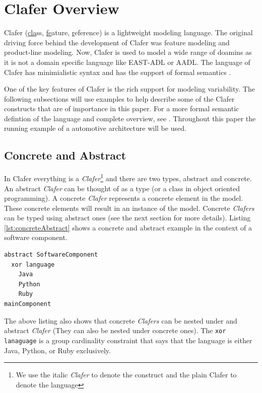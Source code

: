 \documentclass[10pt,oneside]{IEEEtran}
\begin{document}
\section{Clafer Overview}
Clafer (\underline{cla}ss, \underline{fe}ature, \underline{r}eference) is a lightweight modeling language.
The original driving force behind the development of Clafer was feature modeling and product-line modeling.
Now, Clafer is used to model a wide range of doamins as it is not a domain specific language like EAST-ADL
or AADL. The language of Clafer has minimialistic syntax and has the support of
formal semantics \cite{9}.

One of the key features of Clafer is the rich support for modeling variability. The following subsections
will use examples to help describe some of the Clafer constructs that are of importance in this paper.
For a more formal semantic defintion of the language and complete overview, see \cite{10}.
Throughout this paper the running example of a automotive architecture will be used.

\subsection{Concrete and Abstract}
In Clafer everything is a \textit{Clafer}\footnote{We use the italic \textit{Clafer} to denote the construct
and the plain Clafer to denote the language} and there are two types, abstract and concrete. An abstract
\textit{Clafer} can be thought of as a type (or a class in object oriented programming). A concrete
\textit{Clafer} represents a concrete element in the model. These concrete elements will result in an
instance of the model. Concrete \textit{Clafers} can be typed using abstract ones (see the next section
for more details). Listing \ref{lst:concreteAbstract} shows a concrete and abstract example in the
context of a software component.

\begin{lstlisting}[label={lst:concreteAbstract},caption={Example of abstract and concrete \textit{Clafers}}]
abstract SoftwareComponent
  xor language
    Java
    Python
    Ruby
mainComponent
\end{lstlisting}

The above listing also shows that concrete \textit{Clafers} can be nested under and abstract \textit{Clafer} (They can also be nested under concrete ones). The \lstinline$xor lanaguage$ is a group cardinality constraint that says that the language is either Java, Python, or Ruby exclusively.
\end{document}
